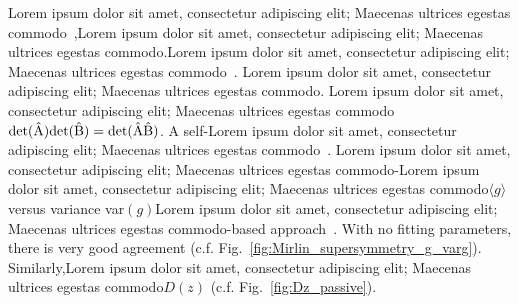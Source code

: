 Lorem ipsum dolor sit amet, consectetur adipiscing elit; Maecenas ultrices egestas commodo~\cite{2007_Froufe-Perez_PRE},Lorem ipsum dolor sit amet, consectetur adipiscing elit; Maecenas ultrices egestas commodo.Lorem ipsum dolor sit amet, consectetur adipiscing elit; Maecenas ultrices egestas commodo~\cite{1968_Osedelec}.
Lorem ipsum dolor sit amet, consectetur adipiscing elit; Maecenas ultrices egestas commodo. %
Lorem ipsum dolor sit amet, consectetur adipiscing elit; Maecenas ultrices egestas commodo
$\rm{det}(\hat{A})\rm{det}(\hat{B})=\rm{det}(\hat{A}\hat{B})$.
A self-Lorem ipsum dolor sit amet, consectetur adipiscing elit; Maecenas ultrices egestas commodo~\cite{1999_yamilov_selfembed,1976_Bellman_Wing_embedding}.
Lorem ipsum dolor sit amet, consectetur adipiscing elit; Maecenas ultrices egestas commodo-Lorem ipsum dolor sit amet, consectetur adipiscing elit; Maecenas ultrices egestas commodo$\langle g \rangle$ versus variance var$(g)$Lorem ipsum dolor sit amet, consectetur adipiscing elit; Maecenas ultrices egestas commodo-based approach~\cite{2000_Mirlin}. With no fitting parameters, there is very good agreement (c.f. Fig.~\ref{fig:Mirlin_supersymmetry_g_varg}). Similarly,Lorem ipsum dolor sit amet, consectetur adipiscing elit; Maecenas ultrices egestas commodo$D(z)$ (c.f. Fig.~\ref{fig:Dz_passive}).

